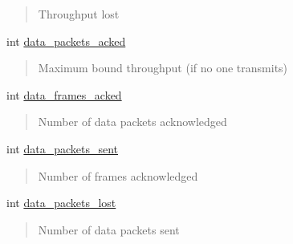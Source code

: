 \begin{DoxyCompactItemize}
\begin{DoxyCompactList}
\begin{quote}
Throughput lost \end{quote}
\end{DoxyCompactList}\item 
\mbox{\label{structPerformance_a6c1392cd482b2060fc3f9ed425bdae17}} 
int \hyperlink{structPerformance_a6c1392cd482b2060fc3f9ed425bdae17}{data\+\_\+packets\+\_\+acked}
\begin{DoxyCompactList}\small\item\em \begin{quote}
Maximum bound throughput (if no one transmits) \end{quote}
\end{DoxyCompactList}\item 
\mbox{\label{structPerformance_a35448373ecf3be1963b582492d11898e}} 
int \hyperlink{structPerformance_a35448373ecf3be1963b582492d11898e}{data\+\_\+frames\+\_\+acked}
\begin{DoxyCompactList}\small\item\em \begin{quote}
Number of data packets acknowledged \end{quote}
\end{DoxyCompactList}\item 
\mbox{\label{structPerformance_a19e957e31dec21a43f654b5344f2f7f3}} 
int \hyperlink{structPerformance_a19e957e31dec21a43f654b5344f2f7f3}{data\+\_\+packets\+\_\+sent}
\begin{DoxyCompactList}\small\item\em \begin{quote}
Number of frames acknowledged \end{quote}
\end{DoxyCompactList}\item 
\mbox{\label{structPerformance_a2352a448fc59f0042527f63806ee3601}} 
int \hyperlink{structPerformance_a2352a448fc59f0042527f63806ee3601}{data\+\_\+packets\+\_\+lost}
\begin{DoxyCompactList}\small\item\em \begin{quote}
Number of data packets sent \end{quote}
\end{DoxyCompactList}\item 
\mbox{\label{structPerformance_a9f80fa31726ff34bb6cf7cd2e4a98c8f}} 

\end{DoxyCompactItemize}
